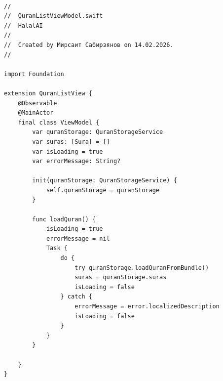 \begin{lstlisting}[basicstyle=\tiny\ttfamily,breaklines=true]

//
//  QuranListViewModel.swift
//  HalalAI
//
//  Created by Мирсаит Сабирзянов on 14.02.2026.
//

import Foundation

extension QuranListView {
    @Observable
    @MainActor
    final class ViewModel {
        var quranStorage: QuranStorageService
        var suras: [Sura] = []
        var isLoading = true
        var errorMessage: String?
        
        init(quranStorage: QuranStorageService) {
            self.quranStorage = quranStorage
        }
        
        func loadQuran() {
            isLoading = true
            errorMessage = nil
            Task {
                do {
                    try quranStorage.loadQuranFromBundle()
                    suras = quranStorage.suras
                    isLoading = false
                } catch {
                    errorMessage = error.localizedDescription
                    isLoading = false
                }
            }
        }

    }
}
\end{lstlisting}

